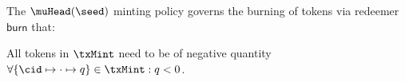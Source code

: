 \noindent The $\muHead(\seed)$ minting policy governs the burning of tokens via
redeemer $\mathsf{burn}$ that:
\begin{menumerate}
  \item All tokens in $\txMint$ need to be of negative quantity
  $\forall \{\cid \mapsto \cdot \mapsto q\} \in \txMint : q < 0$.
\end{menumerate}

\FloatBarrier{}


